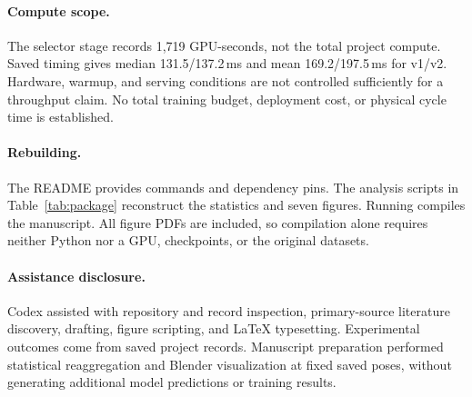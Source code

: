 \paragraph{Compute scope.}
The selector stage records 1,719 GPU-seconds, not the total project compute. Saved timing gives median 131.5/137.2\,ms and mean 169.2/197.5\,ms for v1/v2. Hardware, warmup, and serving conditions are not controlled sufficiently for a throughput claim. No total training budget, deployment cost, or physical cycle time is established.

\paragraph{Rebuilding.}
The README provides commands and dependency pins. The analysis scripts in Table~\ref{tab:package} reconstruct the statistics and seven figures. Running  compiles the manuscript. All figure PDFs are included, so compilation alone requires neither Python nor a GPU, checkpoints, or the original datasets.

\paragraph{Assistance disclosure.}
Codex assisted with repository and record inspection, primary-source literature discovery, drafting, figure scripting, and LaTeX typesetting. Experimental outcomes come from saved project records. Manuscript preparation performed statistical reaggregation and Blender visualization at fixed saved poses, without generating additional model predictions or training results.
